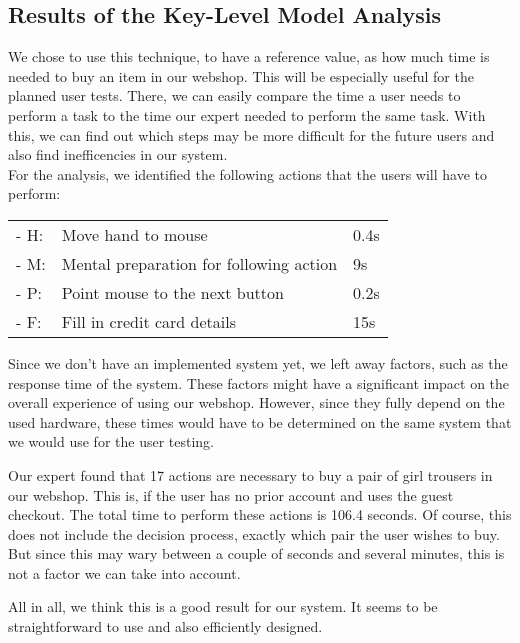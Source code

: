 \subsection{Results of the Key-Level Model Analysis}
We chose to use this technique, to have a reference value, as how much time is needed to buy an item in our webshop. This will be especially useful for the planned user tests. There, we can easily compare the time a user needs to perform a task to the time our expert needed to perform the same task. With this, we can find out which steps may be more difficult for the future users and also find inefficencies in our system.\\
For the analysis, we identified the following actions that the users will have to perform:\\
\begin{tabular}{l l l}
	\hspace{0.5cm}- H: & Move hand to mouse & 0.4s\\
	\hspace{0.5cm}- M: & Mental preparation for following action & 9s\\
	\hspace{0.5cm}- P: & Point mouse to the next button & 0.2s\\
	\hspace{0.5cm}- F: & Fill in credit card details & 15s\\
\end{tabular}

Since we don't have an implemented system yet, we left away factors, such as the response time of the system. These factors might have a significant impact on the overall experience of using our webshop. However, since they fully depend on the used hardware, these times would have to be determined on the same system that we would use for the user testing.

Our expert found that 17 actions are necessary to buy a pair of girl trousers in our webshop. This is, if the user has no prior account and uses the guest checkout. The total time to perform these actions is 106.4 seconds. Of course, this does not include the decision process, exactly which pair the user wishes to buy. But since this may wary between a couple of seconds and several minutes, this is not a factor we can take into account.

All in all, we think this is a good result for our system. It seems to be straightforward to use and also efficiently designed.